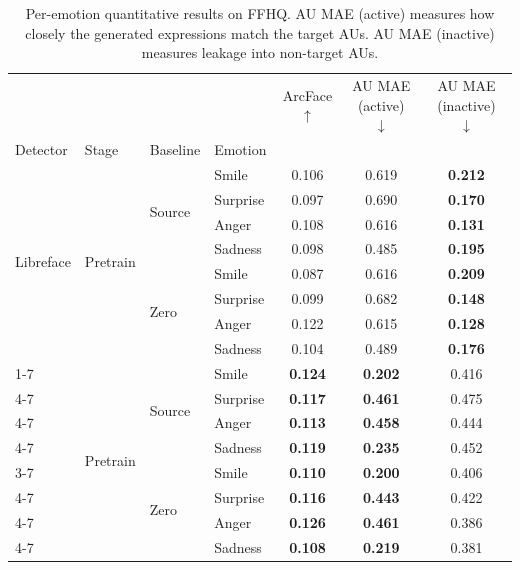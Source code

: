 \begin{table}[htb]
\caption{Per-emotion quantitative results on FFHQ. AU MAE (active) measures how closely the generated expressions match the target \acp{AU}. AU MAE (inactive) measures leakage into non-target \acp{AU}.}
\label{tab:results-emotion-per-config-ffhq}
\begin{tabular}{llllccc}
\toprule
 &  &  &  & ArcFace $\uparrow$ & AU MAE (active) $\downarrow$ & AU MAE (inactive) $\downarrow$ \\
Detector & Stage & Baseline & Emotion &  &  &  \\
\midrule
\multirow[t]{8}{*}{Libreface} & \multirow[t]{8}{*}{Pretrain} & \multirow[t]{4}{*}{Source} & Smile & 0.106 & 0.619 & \textbf{0.212} \\
\cmidrule{4-7}
 &  &  & Surprise & 0.097 & 0.690 & \textbf{0.170} \\
\cmidrule{4-7}
 &  &  & Anger & 0.108 & 0.616 & \textbf{0.131} \\
\cmidrule{4-7}
 &  &  & Sadness & 0.098 & 0.485 & \textbf{0.195} \\
\cmidrule{3-7}
 &  & \multirow[t]{4}{*}{Zero} & Smile & 0.087 & 0.616 & \textbf{0.209} \\
\cmidrule{4-7}
 &  &  & Surprise & 0.099 & 0.682 & \textbf{0.148} \\
\cmidrule{4-7}
 &  &  & Anger & 0.122 & 0.615 & \textbf{0.128} \\
\cmidrule{4-7}
 &  &  & Sadness & 0.104 & 0.489 & \textbf{0.176} \\
\cmidrule{1-7}
\multirow[t]{8}{*}{Pyfeat} & \multirow[t]{8}{*}{Pretrain} & \multirow[t]{4}{*}{Source} & Smile & \textbf{0.124} & \textbf{0.202} & 0.416 \\
\cmidrule{4-7}
 &  &  & Surprise & \textbf{0.117} & \textbf{0.461} & 0.475 \\
\cmidrule{4-7}
 &  &  & Anger & \textbf{0.113} & \textbf{0.458} & 0.444 \\
\cmidrule{4-7}
 &  &  & Sadness & \textbf{0.119} & \textbf{0.235} & 0.452 \\
\cmidrule{3-7}
 &  & \multirow[t]{4}{*}{Zero} & Smile & \textbf{0.110} & \textbf{0.200} & 0.406 \\
\cmidrule{4-7}
 &  &  & Surprise & \textbf{0.116} & \textbf{0.443} & 0.422 \\
\cmidrule{4-7}
 &  &  & Anger & \textbf{0.126} & \textbf{0.461} & 0.386 \\
\cmidrule{4-7}
 &  &  & Sadness & \textbf{0.108} & \textbf{0.219} & 0.381 \\
\bottomrule
\end{tabular}
\end{table}
